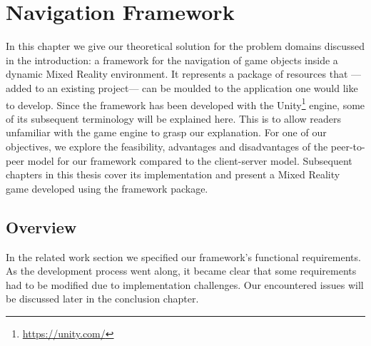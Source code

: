 
\chapter{Navigation Framework}
In this chapter we give our theoretical solution for the problem domains discussed in the introduction: a framework for the navigation of game objects inside a dynamic Mixed Reality environment. It represents a package of resources that ---added to an existing project--- can be moulded to the application one would like to develop. Since the framework has been developed with the Unity\footnote{\protect\url{https://unity.com/}} engine, some of its subsequent terminology will be explained here. This is to allow readers unfamiliar with the game engine to grasp our explanation. For one of our objectives, we explore the feasibility, advantages and disadvantages of the peer-to-peer model for our framework compared to the client-server model. Subsequent chapters in this thesis cover its implementation and present a Mixed Reality game developed using the framework package.

\section{Overview}
In the related work section we specified our framework's functional requirements. As the development process went along, it became clear that some requirements had to be modified due to implementation challenges. Our encountered issues will be discussed later in the conclusion chapter.


